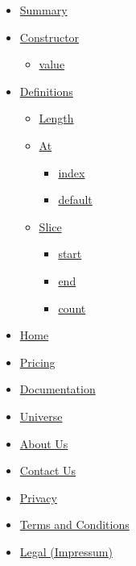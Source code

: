\begin{itemize}
\tightlist
\item
  \hyperref[summary]{Summary}
\item
  \hyperref[constructor]{Constructor}

  \begin{itemize}
  \tightlist
  \item
    \hyperref[constructor-value]{value}
  \end{itemize}
\item
  \hyperref[definitions]{Definitions}

  \begin{itemize}
  \tightlist
  \item
    \hyperref[definitions-len]{Length}
  \item
    \hyperref[definitions-at]{At}

    \begin{itemize}
    \tightlist
    \item
      \hyperref[definitions-at-index]{index}
    \item
      \hyperref[definitions-at-default]{default}
    \end{itemize}
  \item
    \hyperref[definitions-slice]{Slice}

    \begin{itemize}
    \tightlist
    \item
      \hyperref[definitions-slice-start]{start}
    \item
      \hyperref[definitions-slice-end]{end}
    \item
      \hyperref[definitions-slice-count]{count}
    \end{itemize}
  \end{itemize}
\end{itemize}

\begin{itemize}
\tightlist
\item
  \href{/}{Home}
\item
  \href{/pricing/}{Pricing}
\item
  \href{/docs/}{Documentation}
\item
  \href{/universe/}{Universe}
\item
  \href{/about/}{About Us}
\item
  \href{/contact/}{Contact Us}
\item
  \href{/privacy/}{Privacy}
\item
  \href{https://typst.app/terms}{Terms and Conditions}
\item
  \href{/legal/}{Legal (Impressum)}
\end{itemize}


